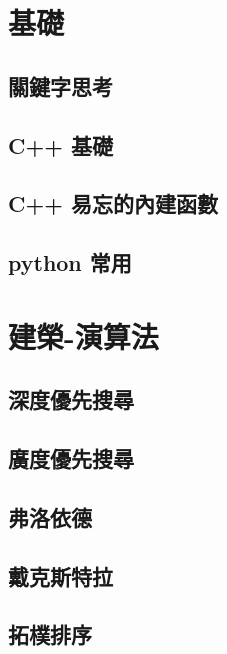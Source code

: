 \section{基礎}
\subsection{關鍵字思考}
\raggedbottom
\hrulefill
\subsection{C++ 基礎}
\raggedbottom
\hrulefill
\subsection{C++ 易忘的內建函數}
\raggedbottom
\hrulefill
\subsection{python 常用}
\raggedbottom
\hrulefill

\section{建榮-演算法}
\subsection{深度優先搜尋}
\raggedbottom
\hrulefill
\subsection{廣度優先搜尋}
\raggedbottom
\hrulefill
\subsection{弗洛依德}
\raggedbottom
\hrulefill
\subsection{戴克斯特拉}
\raggedbottom
\hrulefill
\subsection{拓樸排序}
\raggedbottom
\hrulefill
